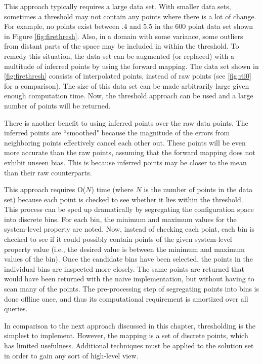 This approach typically requires a large data set.
With smaller data sets, sometimes a threshold may not contain any points where there is a lot of change.
For example, no points exist between .4 and 5.5 in the 600 point data set shown in Figure \ref{fig:firethresh}.
Also, in a domain with some variance, some outliers from distant parts of the space may be included in within the threshold.
To remedy this situation, the data set can be augmented (or replaced) with a multitude of inferred points by using the forward mapping.
The data set shown in \ref{fig:firethresh} consists of interpolated points, instead of raw points (see \ref{fig:rii0} for a comparison).
The size of this data set can be made arbitrarily large given enough computation time.
Now, the threshold approach can be used and a large number of points will be returned.

There is another benefit to using inferred points over the raw data points.
The inferred points are ``smoothed" because the magnitude of the errors from neighboring points effectively cancel each other out.
These points will be even more accurate than the raw points, assuming that the forward mapping does not exhibit unseen bias.
This is because inferred points may be closer to the mean than their raw counterparts.

This approach requires O($N$) time (where $N$ is the number of points in the data set) because each point is checked to see whether it lies within the threshold.
This process can be sped up dramatically by segregating the configuration space into discrete bins.
For each bin, the minimum and maximum values for the system-level property are noted.
Now, instead of checking each point, each bin is checked to see if it could possibly contain points of the given system-level property value (i.e., the desired value is between the minimum and maximum values of the bin).
Once the candidate bins have been selected, the points in the individual bins are inspected more closely.
The same points are returned that would have been returned with the naive implementation, but without having to scan many of the points.
The pre-processing step of segregating points into bins is done offline once, and thus its computational requirement is amortized over all queries.

In comparison to the next approach discussed in this chapter, thresholding is the simplest to implement.
However, the mapping is a set of discrete points, which has limited usefulness.
Additional techniques must be applied to the solution set in order to gain any sort of high-level view.

